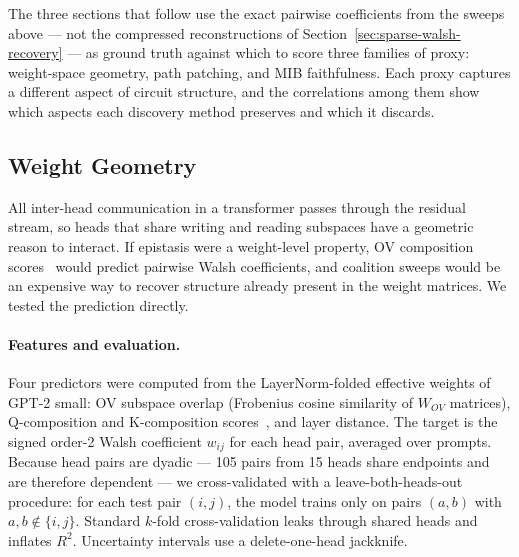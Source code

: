 \documentclass{article}
\begin{document}
The three sections that follow use the exact pairwise coefficients from the sweeps above --- not the compressed reconstructions of
Section~\ref{sec:sparse-walsh-recovery} --- as ground truth against which to score three
families of proxy: weight-space geometry, path patching, and MIB faithfulness. Each
proxy captures a different aspect of circuit structure, and the correlations among them
show which aspects each discovery method preserves and which it discards.


%
%

\subsection{Weight Geometry}
\label{sec:weight-geometry}

All inter-head communication in a transformer passes through the residual
stream, so heads that share writing and reading subspaces have a geometric
reason to interact. If epistasis were a weight-level property, OV composition
scores~\citep{elhage2021mathematical} would predict pairwise Walsh
coefficients, and coalition sweeps would be an expensive way to recover
structure already present in the weight matrices. We tested the prediction directly.

\paragraph{Features and evaluation.}

Four predictors were computed from the LayerNorm-folded effective
weights of GPT-2 small: OV subspace overlap (Frobenius cosine similarity
of $W_{OV}$ matrices), Q-composition and K-composition
scores~\citep{elhage2021mathematical}, and layer distance. The target is
the signed order-2 Walsh coefficient $w_{ij}$ for each head pair, averaged
over prompts. Because head pairs are dyadic --- 105 pairs from 15 heads
share endpoints and are therefore dependent --- we cross-validated with a
leave-both-heads-out procedure: for each test pair $(i,j)$, the model
trains only on pairs $(a,b)$ with $a,b \notin \{i,j\}$. Standard
$k$-fold cross-validation leaks through shared heads and inflates
$R^2$. Uncertainty intervals use a delete-one-head jackknife.
\end{document}
